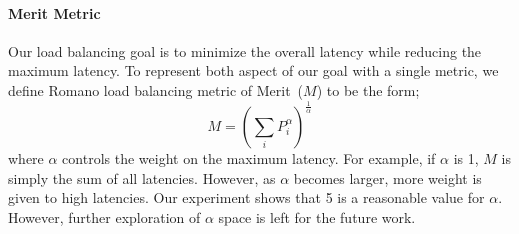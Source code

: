 \paragraph{Merit Metric}
Our load balancing goal is to minimize the overall latency while reducing the maximum latency.
To represent both aspect of our goal with a single metric, we define Romano load balancing metric of Merit~($M$) to be the form;
\begin{equation}\label{merit}
M=\left(\sum_iP_i^\alpha\right)^\frac{1}{\alpha}
\end{equation}
where $\alpha$ controls the weight on the maximum latency.
For example, if $\alpha$ is 1, $M$ is simply the sum of all latencies.
However, as $\alpha$ becomes larger, more weight is given to high latencies.
Our experiment shows that 5 is a reasonable value for $\alpha$.
However, further exploration of $\alpha$ space is left for the future work.

